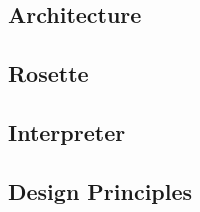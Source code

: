 
\subsection{Architecture}

\subsection{Rosette}

\subsection{\jsil Interpreter}

\subsection{Design Principles}  
